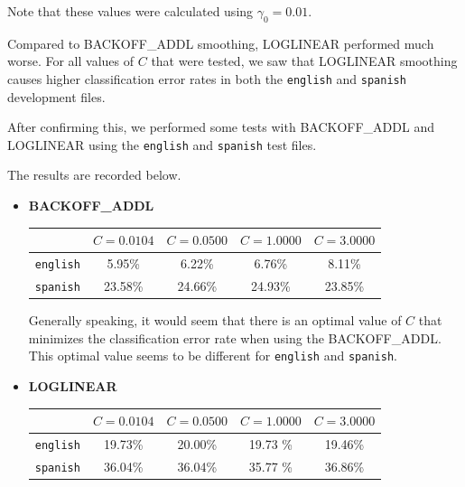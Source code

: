 \documentclass[11pt]{article}
\begin{document}
\begin{enumerate}
\begin{enumerate}[label=(\alph*)]
\begin{itemize}
			Note that these values were calculated using $\gamma_0 = 0.01$.

		\end{itemize} \vspace{8pt}

		Compared to BACKOFF\_ADDL smoothing, LOGLINEAR performed much worse. For all values of $C$ that were tested, we saw that LOGLINEAR smoothing causes higher classification error rates in both the \texttt{english} and \texttt{spanish} development files.

		After confirming this, we performed some tests with BACKOFF\_ADDL and LOGLINEAR using the \texttt{english} and \texttt{spanish} test files.

		The results are recorded below.

		\begin{itemize}
		\item[] \hspace{-24pt} \textbf{BACKOFF\_ADDL} \vspace{8pt}

			\begin{center}\begin{tabular}{| r || c | c | c | c |}
			\hline
							 & $C=0.0104$ & $C=0.0500$ & $C=1.0000$ & $C=3.0000$ \\
			\hline \hline
			\texttt{english} & 5.95\%     & 6.22\%	   & 6.76\%     & 8.11\%	 \\
			\texttt{spanish} & 23.58\%    & 24.66\%	   & 24.93\%    & 23.85\%	 \\
			\hline
			\end{tabular}\end{center} \vspace{8pt}

			Generally speaking, it would seem that there is an optimal value of $C$ that minimizes the classification error rate when using the BACKOFF\_ADDL. This optimal value seems to be different for \texttt{english} and \texttt{spanish}.
			\vspace{8pt} \\

		\item[] \hspace{-24pt} \textbf{LOGLINEAR} \vspace{8pt}

			\begin{center}\begin{tabular}{| r || c | c | c | c |}
			\hline
							 & $C=0.0104$ & $C=0.0500$ & $C=1.0000$ & $C=3.0000$ \\
			\hline \hline
			\texttt{english} & 19.73\%    & 20.00\%	   & 19.73 \%   & 19.46\%	 \\
			\texttt{spanish} & 36.04\%    & 36.04\%	   & 35.77 \%   & 36.86\%	 \\
			\hline
			\end{tabular}\end{center} \vspace{8pt}


\end{itemize}
\end{enumerate}
\end{enumerate}
\end{document}
